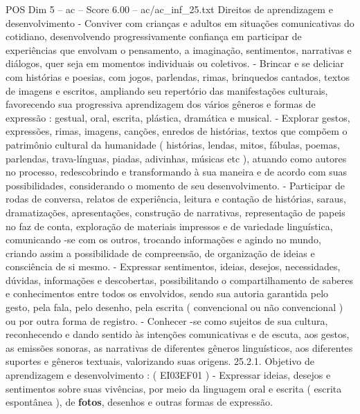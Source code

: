 \begin{textsample}{POS Dim 5 – ac – Score 6.00 – ac/ac\_inf\_25.txt}
Direitos de aprendizagem e desenvolvimento - Conviver com crianças e adultos em situações comunicativas do cotidiano, desenvolvendo progressivamente confiança em participar de experiências que envolvam o pensamento, a imaginação, sentimentos, narrativas e diálogos, quer seja em momentos individuais ou coletivos. - Brincar e se deliciar com histórias e poesias, com jogos, parlendas, rimas, brinquedos cantados, textos de imagens e escritos, ampliando seu repertório das manifestações culturais, favorecendo sua progressiva aprendizagem dos vários gêneros e formas de expressão : gestual, oral, escrita, plástica, dramática e musical. - Explorar gestos, expressões, rimas, imagens, canções, enredos de histórias, textos que compõem o patrimônio cultural da humanidade ( histórias, lendas, mitos, fábulas, poemas, parlendas, trava-línguas, piadas, adivinhas, músicas etc ), atuando como autores no processo, redescobrindo e transformando à sua maneira e de acordo com suas possibilidades, considerando o momento de seu desenvolvimento. - Participar de rodas de conversa, relatos de experiência, leitura e contação de histórias, saraus, dramatizações, apresentações, construção de narrativas, representação de papeis no faz de conta, exploração de materiais impressos e de variedade linguística, comunicando -se com os outros, trocando informações e agindo no mundo, criando assim a possibilidade de compreensão, de organização de ideias e consciência de si mesmo. - Expressar sentimentos, ideias, desejos, necessidades, dúvidas, informações e descobertas, possibilitando o compartilhamento de saberes e conhecimentos entre todos os envolvidos, sendo sua autoria garantida pelo gesto, pela fala, pelo desenho, pela escrita ( convencional ou não convencional ) ou por outra forma de registro. - Conhecer -se como sujeitos de sua cultura, reconhecendo e dando sentido às intenções comunicativas e de escuta, aos gestos, as emissões sonoras, as narrativas de diferentes gêneros linguísticos, aos diferentes suportes e gêneros textuais, valorizando suas origens. 25.2.1.
Objetivo de aprendizagem e desenvolvimento : ( EI03EF01 ) - Expressar ideias, desejos e sentimentos sobre suas vivências, por meio da linguagem oral e escrita ( escrita espontânea ), de \textbf{fotos}, desenhos e outras formas de expressão.

\end{textsample}
